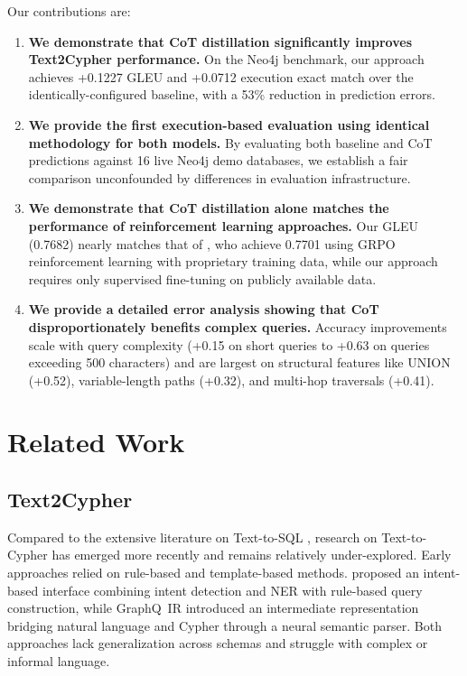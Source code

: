 \documentclass[11pt]{article}
\begin{document}
Our contributions are:
\begin{enumerate}[leftmargin=*]
    \item \textbf{We demonstrate that CoT distillation significantly improves Text2Cypher performance.} On the Neo4j benchmark, our approach achieves +0.1227 GLEU and +0.0712 execution exact match over the identically-configured baseline, with a 53\% reduction in prediction errors.
    \item \textbf{We provide the first execution-based evaluation using identical methodology for both models.} By evaluating both baseline and CoT predictions against 16 live Neo4j demo databases, we establish a fair comparison unconfounded by differences in evaluation infrastructure.
    \item \textbf{We demonstrate that CoT distillation alone matches the performance of reinforcement learning approaches.} Our GLEU (0.7682) nearly matches that of \citet{tran2025refining}, who achieve 0.7701 using GRPO reinforcement learning with proprietary training data, while our approach requires only supervised fine-tuning on publicly available data.
    \item \textbf{We provide a detailed error analysis showing that CoT disproportionately benefits complex queries.} Accuracy improvements scale with query complexity (+0.15 on short queries to +0.63 on queries exceeding 500 characters) and are largest on structural features like UNION (+0.52), variable-length paths (+0.32), and multi-hop traversals (+0.41).
\end{enumerate}

\section{Related Work}

\subsection{Text2Cypher}

Compared to the extensive literature on Text-to-SQL \citep{mohammadjafari2024survey, liu2024survey}, research on Text-to-Cypher has emerged more recently and remains relatively under-explored. Early approaches relied on rule-based and template-based methods. \citet{kobeissi2021intent} proposed an intent-based interface combining intent detection and NER with rule-based query construction, while GraphQ~IR \citep{nie2022graphqir} introduced an intermediate representation bridging natural language and Cypher through a neural semantic parser. Both approaches lack generalization across schemas and struggle with complex or informal language.
\end{document}
